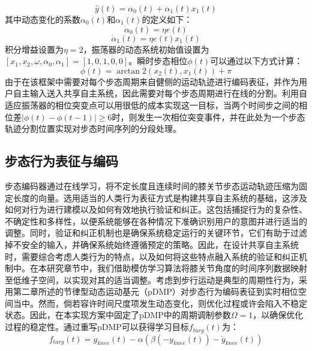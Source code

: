 \begin{equation}
\label{deqn_ex4}
\hat y(t) = {\alpha _0}(t) + {\alpha _1}(t){x_1}(t)
\end{equation}    
其中动态变化的系数${\alpha _0}(t)$和${\alpha _1}(t)$的定义如下：
\begin{equation}
\label{deqn_ex5}
{\dot \alpha _0}(t) = \eta e(t)
\end{equation}   
\begin{equation}
\label{deqn_ex6}
{\dot \alpha _1}(t) = \eta e(t){x_1}(t)
\end{equation} 
积分增益设置为$\eta=2$，振荡器的动态系统初始值设置为$[{x_1},{x_2},\omega ,{\alpha _0},{\alpha _1}] = [1,0,1,0,0]$。瞬时步态相位$\phi (t)$可以通过以下方式计算：
\begin{equation}
\label{deqn_ex7}
\phi (t) = \arctan 2({x_2}(t),{x_1}(t)) + \pi 
\end{equation}    
由于在该框架中需要对每个步态周期来自健侧的运动轨迹进行编码表征，并作为用户自主输入送入共享自主系统，因此需要对每个步态周期进行在线的分割。利用自适应振荡器的相位突变点可以用很低的成本实现这一目标，当两个时间步之间的相位差$\lvert \phi (t) - \phi (t - 1) \rvert \geq 6$时，则发生一次相位突变事件，并在此处为一个步态轨迹分割位置实现对步态时间序列的分段处理。  

\subsection{步态行为表征与编码} 步态编码器通过在线学习，将不定长度且连续时间的膝关节步态运动轨迹压缩为固定长度的向量。选用适当的人类行为表征方式是构建共享自主系统的基础，这涉及如何对行为进行建模以及如何有效地执行验证和纠正。这包括捕捉行为的复杂性、不确定性和多样性，以便系统能够在各种情况下准确识别用户的意图并进行适当的调整。同时，验证和纠正机制也是确保系统稳定运行的关键环节，它们有助于过滤掉不安全的输入，并确保系统始终遵循预定的策略。因此，在设计共享自主系统时，需要综合考虑人类行为的特点，以及如何将这些特点融入系统的验证和纠正机制中。在本研究章节中，我们借助模仿学习算法\cite{schaalImitationLearningRoute1999}将膝关节角度的时间序列数据映射至低维子空间，以实现对其的适当调整。考虑到步行运动是典型的周期性行为，采用第二章所述的节律型动态运动基元（pDMP）\cite{ijspeertDynamicalMovementPrimitives2013,gamsOnlineLearningModulation2009}对步态行为编码表征到实时相位空间当中。然而，倘若容许时间尺度项发生动态变化，则优化过程或许会陷入不稳定状态。因此，在本实现方案中固定了pDMP中的周期调制参数$\Omega  = 1$，以确保优化过程的稳定性。通过重写pDMP可以获得学习目标${f_{targ}}(t)$为：
\begin{equation}
  {f_{targ}}(t) = {\ddot y_{knee}}(t) - {\alpha}({\beta}( - {y_{knee}}(t)) - {\dot y_{knee}}(t))
  \label{eq:5-1}
\end{equation}    


